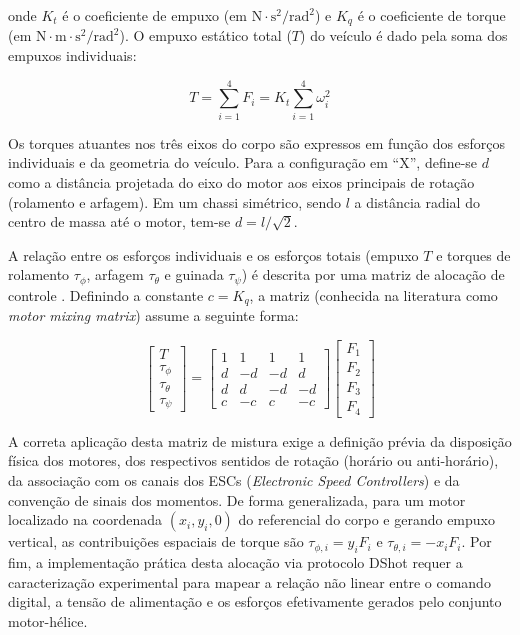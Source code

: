 \noindent onde $K_t$ é o coeficiente de empuxo (em $\mathrm{N\cdot s^2/rad^2}$) e $K_q$ é o coeficiente de torque (em $\mathrm{N\cdot m\cdot s^2/rad^2}$). O empuxo estático total ($T$) do veículo é dado pela soma dos empuxos individuais:

\begin{equation}\label{eq:empuxo_total}
T = \sum_{i=1}^{4} F_i = K_t \sum_{i=1}^{4} \omega_i^2
\end{equation}

Os torques atuantes nos três eixos do corpo são expressos em função dos esforços individuais e da geometria do veículo. Para a configuração em ``X'', define-se $d$ como a distância projetada do eixo do motor aos eixos principais de rotação (rolamento e arfagem). Em um chassi simétrico, sendo $l$ a distância radial do centro de massa até o motor, tem-se $d = l/\sqrt{2}$. 

A relação entre os esforços individuais e os esforços totais (empuxo $T$ e torques de rolamento $\tau_\phi$, arfagem $\tau_\theta$ e guinada $\tau_\psi$) é descrita por uma matriz de alocação de controle \cite{quan2017}. Definindo a constante $c = K_q$, a matriz (conhecida na literatura como \textit{motor mixing matrix}) assume a seguinte forma:

\begin{equation}\label{eq:mixing}
\begin{bmatrix} T \\ \tau_\phi \\ \tau_\theta \\ \tau_\psi \end{bmatrix}
= \begin{bmatrix}
1 & 1 & 1 & 1 \\
d & -d & -d & d \\
d & d & -d & -d \\
c & -c & c & -c
\end{bmatrix}
\begin{bmatrix} F_1 \\ F_2 \\ F_3 \\ F_4 \end{bmatrix}
\end{equation}

\noindent A correta aplicação desta matriz de mistura exige a definição prévia da disposição física dos motores, dos respectivos sentidos de rotação (horário ou anti-horário), da associação com os canais dos ESCs (\textit{Electronic Speed Controllers}) e da convenção de sinais dos momentos. De forma generalizada, para um motor localizado na coordenada $(x_i,y_i,0)$ do referencial do corpo e gerando empuxo vertical, as contribuições espaciais de torque são $\tau_{\phi,i} = y_i F_i$ e $\tau_{\theta,i} = -x_i F_i$. Por fim, a implementação prática desta alocação via protocolo DShot requer a caracterização experimental para mapear a relação não linear entre o comando digital, a tensão de alimentação e os esforços efetivamente gerados pelo conjunto motor-hélice.

